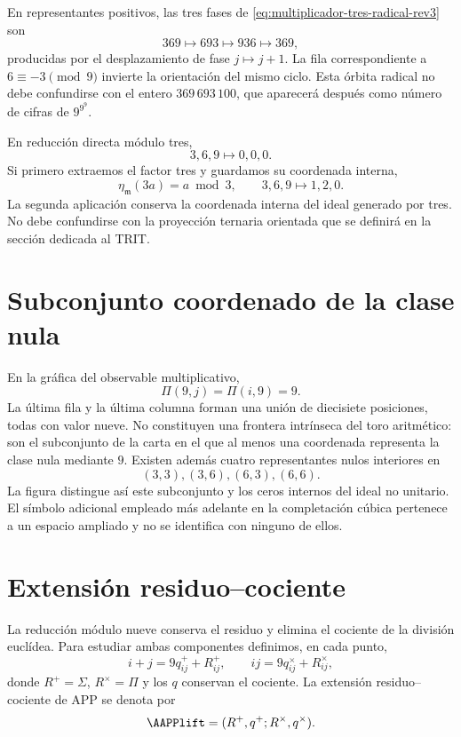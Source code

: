 En representantes positivos, las tres fases de
\eqref{eq:multiplicador-tres-radical-rev3} son
\begin{equation}
 369\longmapsto693\longmapsto936\longmapsto369,
 \label{eq:orbita-radical-369-rev3}
\end{equation}
producidas por el desplazamiento de fase \(j\mapsto j+1\). La fila
correspondiente a \(6\equiv-3\pmod9\) invierte la orientación del mismo
ciclo. Esta órbita radical no debe confundirse con el entero
\(369\,693\,100\), que aparecerá después como número de cifras de
\(9^{9^9}\).

En reducción directa módulo tres,
\[
3,6,9\longmapsto0,0,0.
\]
Si primero extraemos el factor tres y guardamos su coordenada interna,
\[
\eta_{\mathfrak m}(3a)=a\bmod3,
\qquad
3,6,9\longmapsto1,2,0.
\]
La segunda aplicación conserva la coordenada interna del ideal generado por
tres. No debe confundirse con la proyección ternaria orientada que se definirá
en la sección dedicada al TRIT\@.

\section{Subconjunto coordenado de la clase nula}

En la gráfica del observable multiplicativo,
\[
\Pi(9,j)=\Pi(i,9)=9.
\]
La última fila y la última columna forman una unión de diecisiete posiciones,
todas con valor nueve. No constituyen una frontera intrínseca del toro
aritmético: son el subconjunto de la carta en el que al menos una coordenada
representa la clase nula mediante \(9\). Existen además cuatro representantes nulos interiores en
\[
(3,3),(3,6),(6,3),(6,6).
\]
La figura distingue así este subconjunto y los ceros internos del ideal
no unitario. El símbolo adicional empleado más adelante en la completación
cúbica pertenece a un espacio ampliado y no se identifica con ninguno de
ellos.

\section{Extensión residuo--cociente}

La reducción módulo nueve conserva el residuo y elimina el cociente de la
división euclídea. Para estudiar ambas componentes definimos, en cada punto,
\[
i+j=9q^+_{ij}+R^+_{ij},
\qquad
ij=9q^\times_{ij}+R^\times_{ij},
\]
donde \(R^+=\Sigma\), \(R^\times=\Pi\) y los \(q\) conservan el cociente.
La extensión residuo--cociente de APP se denota por
\[
\AAPPlift=(R^+,q^+;R^\times,q^\times).
\]

